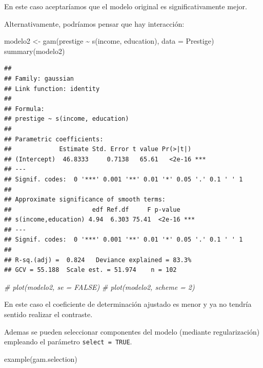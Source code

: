 \documentclass[
  spanish,
]{book}
\newenvironment{Shaded}{\begin{snugshade}}{\end{snugshade}}
\newcommand{\AttributeTok}[1]{\textcolor[rgb]{0.77,0.63,0.00}{#1}}
\newcommand{\CommentTok}[1]{\textcolor[rgb]{0.56,0.35,0.01}{\textit{#1}}}
\newcommand{\FunctionTok}[1]{\textcolor[rgb]{0.00,0.00,0.00}{#1}}
\newcommand{\NormalTok}[1]{#1}
\newcommand{\OtherTok}[1]{\textcolor[rgb]{0.56,0.35,0.01}{#1}}
\newcommand{\SpecialCharTok}[1]{\textcolor[rgb]{0.00,0.00,0.00}{#1}}
\theoremstyle{break}
\theoremstyle{definition}
\theoremstyle{definition}
\theoremstyle{definition}
\theoremstyle{definition}
\theoremstyle{remark}
\begin{document}
En este caso aceptaríamos que el modelo original es significativamente mejor.

Alternativamente, podríamos pensar que hay interacción:

\begin{Shaded}
\begin{Highlighting}[]
\NormalTok{modelo2 }\OtherTok{\textless{}{-}} \FunctionTok{gam}\NormalTok{(prestige }\SpecialCharTok{\textasciitilde{}} \FunctionTok{s}\NormalTok{(income, education), }\AttributeTok{data =}\NormalTok{ Prestige)}
\FunctionTok{summary}\NormalTok{(modelo2)}
\end{Highlighting}
\end{Shaded}

\begin{verbatim}
## 
## Family: gaussian 
## Link function: identity 
## 
## Formula:
## prestige ~ s(income, education)
## 
## Parametric coefficients:
##             Estimate Std. Error t value Pr(>|t|)    
## (Intercept)  46.8333     0.7138   65.61   <2e-16 ***
## ---
## Signif. codes:  0 '***' 0.001 '**' 0.01 '*' 0.05 '.' 0.1 ' ' 1
## 
## Approximate significance of smooth terms:
##                      edf Ref.df     F p-value    
## s(income,education) 4.94  6.303 75.41  <2e-16 ***
## ---
## Signif. codes:  0 '***' 0.001 '**' 0.01 '*' 0.05 '.' 0.1 ' ' 1
## 
## R-sq.(adj) =  0.824   Deviance explained = 83.3%
## GCV = 55.188  Scale est. = 51.974    n = 102
\end{verbatim}

\begin{Shaded}
\begin{Highlighting}[]
\CommentTok{\# plot(modelo2, se = FALSE)}
\CommentTok{\# plot(modelo2, scheme = 2)}
\end{Highlighting}
\end{Shaded}

En este caso el coeficiente de determinación ajustado es menor y ya no tendría sentido realizar el contraste.

Ademas se pueden seleccionar componentes del modelo (mediante regularización) empleando el parámetro \texttt{select\ =\ TRUE}.

\begin{Shaded}
\begin{Highlighting}[]
\FunctionTok{example}\NormalTok{(gam.selection)}
\end{Highlighting}
\end{Shaded}
\end{document}
